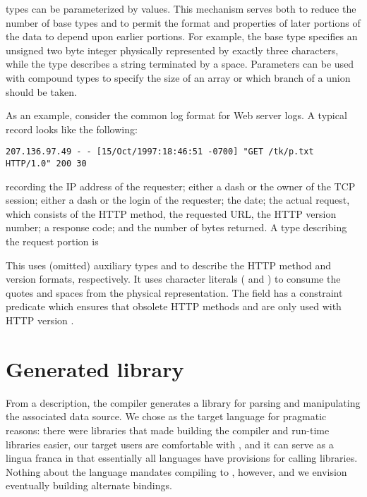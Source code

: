 \pads{} types can be parameterized by values.
This mechanism
serves both to reduce the number of base types and to permit the
format and properties of later portions of the data to depend upon earlier portions.
For example, 
the base type  specifies an unsigned two byte integer
physically represented by exactly three characters, while the type
describes a string terminated by a space.  Parameters can be 
used with compound types to specify the size of an array or which
branch of a union should be taken.


As an example, consider the common log format for Web server logs.  A
typical record looks like the following:
\begin{verbatim}
207.136.97.49 - - [15/Oct/1997:18:46:51 -0700] "GET /tk/p.txt HTTP/1.0" 200 30
\end{verbatim}

\noindent
recording the IP address of the requester; either a dash or the owner
of the TCP session; either a dash or the login of the requester; the
date; the actual request, which consists of the HTTP method, the
requested URL, the HTTP version number; a response code; and the
number of bytes returned.  A \PADSL{} type describing the request
portion is

This \pstruct{} uses (omitted) auxiliary types  and
 to describe
the HTTP method and version formats, respectively.
It uses character literals ( and ) to consume
the quotes and 
spaces from the physical representation. 
The  field has a constraint predicate 
which ensures that obsolete HTTP methods  and  
are only used with HTTP version .

\section{Generated library}
From a description, the \pads{} compiler generates a \C{} library
for parsing and manipulating the associated data source.  We chose \C{}
as the target language for pragmatic reasons: there were 
libraries that made building the compiler and run-time libraries easier,
our target users are comfortable with \C{}, and it can serve 
as a lingua franca in that essentially all languages have provisions for 
calling \C{} libraries.  Nothing about the \pads{} language mandates compiling
to \C{}, however, and we envision eventually building alternate bindings.

